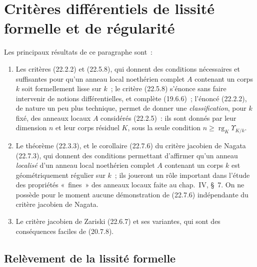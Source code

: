 \section{Critères différentiels de lissité formelle et de régularité}
\label{section:0.22-fr}

Les principaux résultats de ce paragraphe sont~:
\begin{enumerate}
  \item[a)] Les critères (22.2.2) et (22.5.8), qui donnent des conditions
  nécessaires et suffisantes pour qu'un anneau local noethérien complet $A$
  contenant un corps $k$ soit formellement lisse sur $k$~; le critère
  (22.5.8) s'énonce sans faire intervenir de notions différentielles, et
  complète (19.6.6)~; l'énoncé (22.2.2), de nature un peu plus technique,
  permet de donner une \emph{classification}, pour $k$ fixé, des anneaux
  locaux $A$ considérés (22.2.5)~: ils sont donnés par leur dimension $n$ et
  leur corps résiduel $K$, sous la seule condition
  $n\geqslant\operatorname{rg}_K\Upsilon_{K/k}$.

  \item[b)] Le théorème (22.3.3), et le corollaire (22.7.6) du critère
  jacobien de Nagata (22.7.3), qui donnent des conditions permettant
  d'affirmer qu'un anneau \emph{localisé} d'un anneau local noethérien complet
  $A$ contenant un corps $k$ est géométriquement régulier sur $k$~; ils
  joueront un rôle important dans l'étude des propriétés «~fines~» des
  anneaux locaux faite au chap.~IV, §~7. On ne possède pour le moment aucune
  démonstration de (22.7.6) indépendante du critère jacobien de Nagata.

  \item[c)] Le critère jacobien de Zariski (22.6.7) et ses variantes, qui
  sont des conséquences faciles de (20.7.8).
\end{enumerate}


\subsection{Relèvement de la lissité formelle}
\label{subsection:0.22.1-fr}

